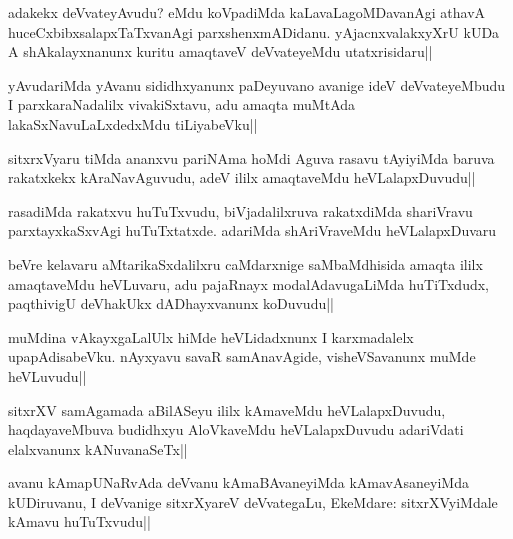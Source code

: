 
\begin{artha}%
adakekx deVvateyAvudu? eMdu koVpadiMda kaLavaLagoMDavanAgi athavA huceCxbibxsalapxTaTxvanAgi parxshenxmADidanu. yAjacnxvalakxyXrU kUDa A shAkalayxnanunx kuritu amaqtaveV deVvateyeMdu utatxrisidaru||
\end{artha}


\begin{artha}
yAvudariMda yAvanu sididhxyanunx paDeyuvano avanige ideV deVvateyeMbudu I parxkaraNadalilx vivakiSxtavu, adu amaqta muMtAda lakaSxNavuLaLxdedxMdu tiLiyabeVku||
\end{artha}


\begin{artha}
sitxrxVyaru tiMda ananxvu pariNAma hoMdi Aguva rasavu tAyiyiMda baruva rakatxkekx kAraNavAguvudu, adeV ililx amaqtaveMdu heVLalapxDuvudu||
\end{artha}

\begin{artha}
rasadiMda rakatxvu huTuTxvudu, biVjadalilxruva rakatxdiMda shariVravu parxtayxkaSxvAgi huTuTxtatxde. adariMda shAriVraveMdu heVLalapxDuvaru 
\end{artha}

\stext 

\begin{artha}%
beVre kelavaru aMtarikaSxdalilxru caMdarxnige saMbaMdhisida amaqta ililx amaqtaveMdu heVLuvaru, adu pajaRnayx modalAdavugaLiMda huTiTxdudx, paqthivigU deVhakUkx dADhayxvanunx koDuvudu||
\end{artha}

\begin{artha}
muMdina vAkayxgaLalUlx hiMde heVLidadxnunx I karxmadalelx upapAdisabeVku. nAyxyavu savaR samAnavAgide, visheVSavanunx muMde heVLuvudu||
\end{artha}


\begin{artha}
sitxrXV samAgamada aBilASeyu ililx kAmaveMdu heVLalapxDuvudu, haqdayaveMbuva budidhxyu AloVkaveMdu heVLalapxDuvudu adariVdati elalxvanunx kANuvanaSeTx|| 
\end{artha}

\begin{artha}
avanu kAmapUNaRvAda deVvanu kAmaBAvaneyiMda kAmavAsaneyiMda kUDiruvanu, I deVvanige sitxrXyareV deVvategaLu, EkeMdare: sitxrXVyiMdale kAmavu huTuTxvudu||
\end{artha}

